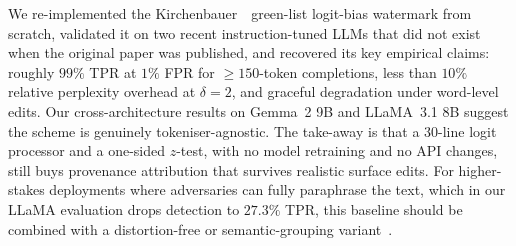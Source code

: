 \documentclass[10pt,twocolumn,letterpaper]{article}
\begin{document}
We re-implemented the Kirchenbauer~\etal\ green-list logit-bias watermark from scratch, validated it on two recent instruction-tuned LLMs that did not exist when the original paper was published, and recovered its key empirical claims: roughly $99\%$ TPR at $1\%$ FPR for $\geq\!150$-token completions, less than $10\%$ relative perplexity overhead at $\delta{=}2$, and graceful degradation under word-level edits. Our cross-architecture results on Gemma~2 9B and LLaMA~3.1 8B suggest the scheme is genuinely tokeniser-agnostic. The take-away is that a 30-line logit processor and a one-sided $z$-test, with no model retraining and no API changes, still buys provenance attribution that survives realistic surface edits. For higher-stakes deployments where adversaries can fully paraphrase the text, which in our LLaMA evaluation drops detection to $27.3\%$ TPR, this baseline should be combined with a distortion-free or semantic-grouping variant~\cite{kuditipudi2023robust,christ2024undetectable}.

{\small


}
\end{document}
